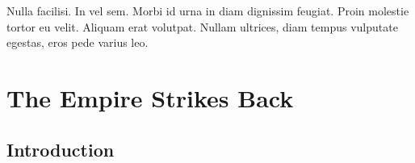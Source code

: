 \graphicspath{{figures/chapter-6/}}


\begin{savequote}[75mm]
Nulla facilisi. In vel sem. Morbi id urna in diam dignissim feugiat. Proin molestie tortor eu velit. Aliquam erat volutpat. Nullam    ultrices, diam tempus vulputate egestas, eros pede varius leo.
\end{savequote}

\chapter{The Empire Strikes Back}


\section{Introduction}

\lipsum[100]
\cite{Salmon2006}


